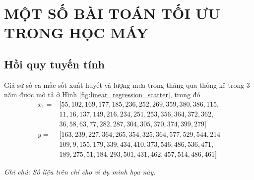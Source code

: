 \documentclass{book}
\begin{document}
\section{MỘT SỐ BÀI TOÁN TỐI ƯU TRONG HỌC MÁY}
\subsection{Hồi quy tuyến tính}
Giả sử số ca mắc sốt xuất huyết và lượng mưa trong tháng qua thống kê trong 3 năm được mô tả ở Hình \ref{fig:linear_regression_scatter}, trong đó
\begin{align*}
x_1 =& [55,	102,	169,	177,	185,	236,	252,	269,	359,	380,	386,	115,\\
& 11,	 16,	137,	149,	216,	234,	251,	253,	356,	364,	372,	362,\\
& 36,	58,	63,	77,	282,	287,	304,	305,	370,	374,	399,	279]\\
y =&[163,	239,	227,	364,	265,	354,	325,	364,	577,	529,	544,	214\\
& 109,	9,	155,	179,	339,	434,	410,	373,	546,	486,	536,	471,\\
& 189,	275,	51,	184,	293,	501,	431,	462,	457,	514,	486,	461]
\end{align*}
\par \textit{Ghi chú: Số liệu trên chỉ cho ví dụ minh họa này.}
\end{document}
